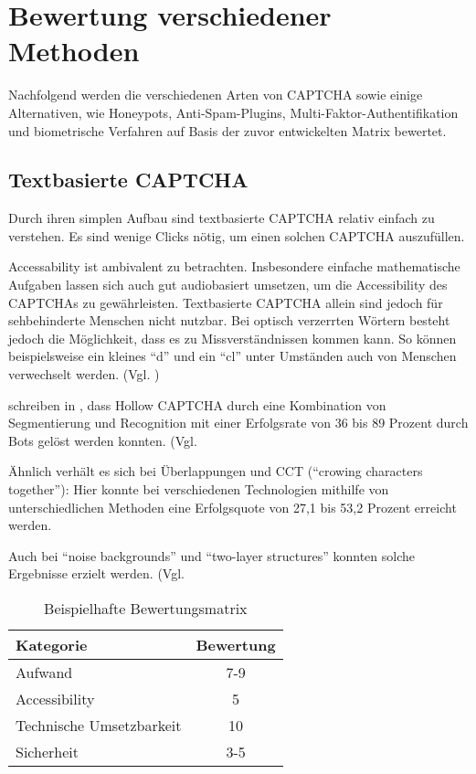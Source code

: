 \chapter{Bewertung verschiedener Methoden}

Nachfolgend werden die verschiedenen Arten von CAPTCHA sowie einige Alternativen, wie Honeypots, Anti-Spam-Plugins, 
Multi-Faktor-Authentifikation und biometrische Verfahren auf Basis der zuvor entwickelten Matrix bewertet. 

\section{Textbasierte CAPTCHA}

Durch ihren simplen Aufbau sind textbasierte CAPTCHA relativ einfach zu verstehen.
Es sind wenige Clicks nötig, um einen solchen CAPTCHA auszufüllen. 

Accessability ist ambivalent zu betrachten.
Insbesondere einfache mathematische Aufgaben lassen sich auch gut audiobasiert umsetzen, 
um die Accessibility des CAPTCHAs zu gewährleisten.
Textbasierte CAPTCHA allein sind jedoch für sehbehinderte Menschen nicht nutzbar.
Bei optisch verzerrten Wörtern besteht jedoch die Möglichkeit, dass es zu Missverständnissen kommen kann.
So können beispielsweise ein kleines ``d'' und ein ``cl'' unter Umständen auch von Menschen verwechselt werden. (Vgl. \cite[p.3]{usabilityofcaptchas})

\citeauthor{surveyofresearch} schreiben in \cite[p.xx]{surveyofresearch}, 
dass Hollow CAPTCHA durch eine Kombination von Segmentierung und Recognition %
mit einer Erfolgsrate von 36 bis 89 Prozent durch Bots gelöst werden konnten. (Vgl. %

Ähnlich verhält es sich bei Überlappungen und CCT (``crowing characters together''):
Hier konnte bei verschiedenen Technologien mithilfe von unterschiedlichen Methoden
eine Erfolgsquote von 27,1 bis 53,2 Prozent erreicht werden. \cite[p.xx]{surveyofresearch} %

Auch bei ``noise backgrounds'' und ``two-layer structures'' konnten solche Ergebnisse erzielt werden. 
(Vgl. \cite[p.xx]{surveyofresearch} %


\begin{table}[h!]
    \caption{Beispielhafte Bewertungsmatrix}
    \begin{center}
        \begin{tabular}{l|c}
            Kategorie                       & Bewertung \\\hline
            Aufwand                         & 7-9         \\
            Accessibility                   & 5        \\
            Technische Umsetzbarkeit        & 10         \\
            Sicherheit                      & 3-5         
        \end{tabular}
    \end{center}
\end{table}

